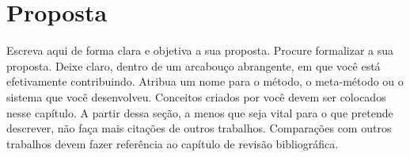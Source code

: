 \chapter[A Sua Proposta]{Proposta}

Escreva aqui de forma clara e objetiva a sua proposta. Procure formalizar a sua proposta. Deixe claro, dentro de um arcabouço abrangente, em que você está efetivamente contribuindo. Atribua um nome para o método, o meta-método ou o sistema que você desenvolveu. Conceitos criados por você devem ser colocados nesse capítulo. A partir dessa seção, a menos que seja vital para o que pretende descrever, não faça mais citações de outros trabalhos. Comparações com outros trabalhos devem fazer referência ao capítulo de revisão bibliográfica.